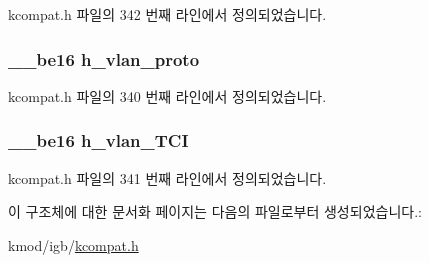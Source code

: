 kcompat.\+h 파일의 342 번째 라인에서 정의되었습니다.

\subsubsection[{\texorpdfstring{h\+\_\+vlan\+\_\+proto}{h_vlan_proto}}]{\setlength{\rightskip}{0pt plus 5cm}\+\_\+\+\_\+be16 h\+\_\+vlan\+\_\+proto}\hypertarget{struct__kc__vlan__ethhdr_aa20e15fd6c035af3e642fb7d87413435}{}\label{struct__kc__vlan__ethhdr_aa20e15fd6c035af3e642fb7d87413435}


kcompat.\+h 파일의 340 번째 라인에서 정의되었습니다.

\subsubsection[{\texorpdfstring{h\+\_\+vlan\+\_\+\+T\+CI}{h_vlan_TCI}}]{\setlength{\rightskip}{0pt plus 5cm}\+\_\+\+\_\+be16 h\+\_\+vlan\+\_\+\+T\+CI}\hypertarget{struct__kc__vlan__ethhdr_aa70cf4362df675d9268e3dd238060f29}{}\label{struct__kc__vlan__ethhdr_aa70cf4362df675d9268e3dd238060f29}


kcompat.\+h 파일의 341 번째 라인에서 정의되었습니다.



이 구조체에 대한 문서화 페이지는 다음의 파일로부터 생성되었습니다.\+:\begin{DoxyCompactItemize}
\item 
kmod/igb/\hyperlink{kcompat_8h}{kcompat.\+h}\end{DoxyCompactItemize}
